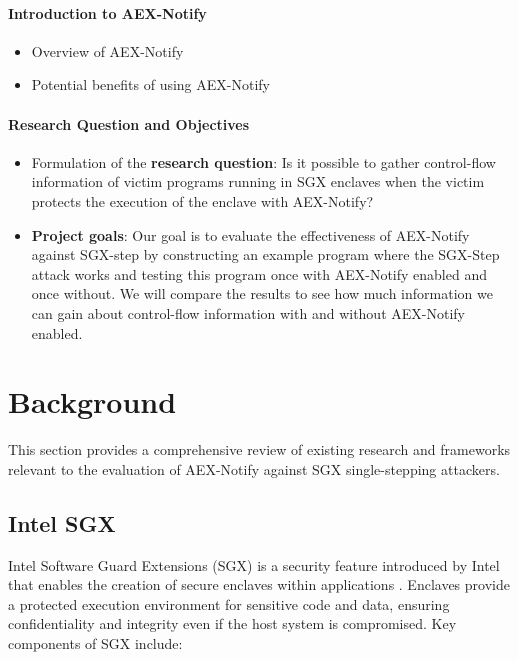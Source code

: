 \documentclass{llncs}
\begin{document}
\paragraph{Introduction to AEX-Notify}
\begin{itemize}
  \item Overview of AEX-Notify
  \item Potential benefits of using AEX-Notify
\end{itemize}

\paragraph{Research Question and Objectives}
\begin{itemize}
  \item Formulation of the \textbf{research question}:
    Is it possible to gather control-flow information of victim programs running
    in SGX enclaves when the victim protects the execution of the enclave with
    AEX-Notify?
  \item \textbf{Project goals}:
    Our goal is to evaluate the effectiveness of AEX-Notify against SGX-step by
    constructing an example program where the SGX-Step attack works and testing
    this program once with AEX-Notify enabled and once without. We will compare
    the results to see how much information we can gain about control-flow
    information with and without AEX-Notify enabled.
\end{itemize}

\section{Background}

This section provides a comprehensive review of existing research and frameworks relevant to the evaluation of AEX-Notify against SGX single-stepping attackers.

\subsection{Intel SGX}

Intel Software Guard Extensions (SGX) is a security feature introduced by Intel that enables the creation of secure enclaves within applications \cite{CostanD16}. Enclaves provide a protected execution environment for sensitive code and data, ensuring confidentiality and integrity even if the host system is compromised. Key components of SGX include:
\end{document}
